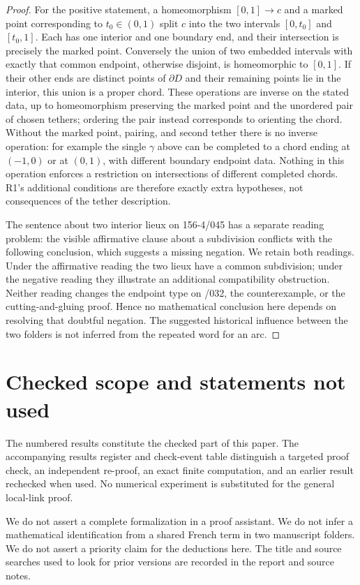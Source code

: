 \documentclass[11pt,a4paper]{article}
\begin{document}
\begin{proof}
For the positive statement, a homeomorphism $[0,1]\to c$ and a marked
point corresponding to $t_0\in(0,1)$ split $c$ into the two intervals
$[0,t_0]$ and $[t_0,1]$. Each has one interior and one boundary end,
and their intersection is precisely the marked point. Conversely the
union of two embedded intervals with exactly that common endpoint,
otherwise disjoint, is homeomorphic to $[0,1]$. If their other ends
are distinct points of $\partial D$ and their remaining points lie
in the interior, this union is a proper chord. These operations
are inverse on the stated data, up to homeomorphism preserving the
marked point and the unordered pair of chosen tethers; ordering the
pair instead corresponds to orienting the chord. Without the marked point,
pairing, and second tether there is no inverse operation: for example
the single $\gamma$ above can be completed to a chord ending at
$(-1,0)$ or at $(0,1)$, with different boundary endpoint data.
Nothing in this operation enforces a restriction on intersections
of different completed chords. R1's additional conditions are
therefore exactly extra hypotheses, not consequences of the tether
description.

The sentence about two interior lieux on 156-4/045 has a separate
reading problem: the visible affirmative clause about a subdivision
conflicts with the following conclusion, which suggests a missing
negation. We retain both readings. Under the affirmative reading
the two lieux have a common subdivision; under the negative reading
they illustrate an additional compatibility obstruction. Neither
reading changes the endpoint type on /032, the counterexample, or
the cutting-and-gluing proof. Hence no mathematical conclusion here
depends on resolving that doubtful negation. The suggested historical
influence between the two folders is not inferred from the repeated
word for an arc.
\end{proof}
\section{Checked scope and statements not used}

The numbered results constitute the checked part of this paper. The
accompanying results register and check-event table distinguish a
targeted proof check, an independent re-proof, an exact finite
computation, and an earlier result rechecked when used. No numerical
experiment is substituted for the general local-link proof.

We do not assert a complete formalization in a proof assistant. We do
not infer a mathematical identification from a shared French term in
two manuscript folders. We do not assert a priority claim for the
deductions here. The title and source searches used to look for prior
versions are recorded in the report and source notes.
\end{document}
